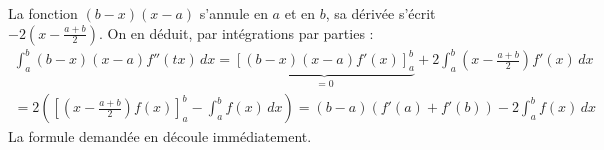 La fonction $(b-x)(x-a)$ s'annule en $a$ et en $b$, sa dérivée s'écrit $-2(x-\frac{a+b}{2})$. On en déduit, par intégrations par parties :
\begin{multline*}
\int_{a}^{b}(b-x)(x-a)f''(tx)\,dx 
= \underset{=0}{\underbrace{[(b-x)(x-a)f'(x)]_a^b}} + 2\int_{a}^{b}(x-\frac{a+b}{2})f'(x)\,dx\\
= 2\left( [(x-\frac{a+b}{2})f(x)]_{a}^{b}-\int_{a}^{b}f(x)\,dx \right) 
= (b-a)\left( f'(a)+f'(b)\right) -2\int_{a}^{b}f(x)\,dx
\end{multline*}
La formule demandée en découle immédiatement.
